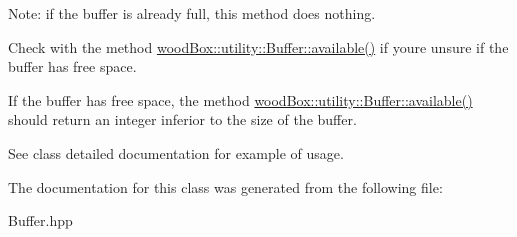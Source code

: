 Note\+: if the buffer is already full, this method does nothing.

Check with the method \mbox{\hyperlink{classwood_box_1_1utility_1_1_buffer_a2bcef18ccdd923a401608a257e4283ca}{wood\+Box\+::utility\+::\+Buffer\+::available()}} if you\textquotesingle{}re unsure if the buffer has free space.

If the buffer has free space, the method \mbox{\hyperlink{classwood_box_1_1utility_1_1_buffer_a2bcef18ccdd923a401608a257e4283ca}{wood\+Box\+::utility\+::\+Buffer\+::available()}} should return an integer inferior to the size of the buffer.

See class detailed documentation for example of usage. 

The documentation for this class was generated from the following file\+:\begin{DoxyCompactItemize}
\item 
Buffer.\+hpp\end{DoxyCompactItemize}
